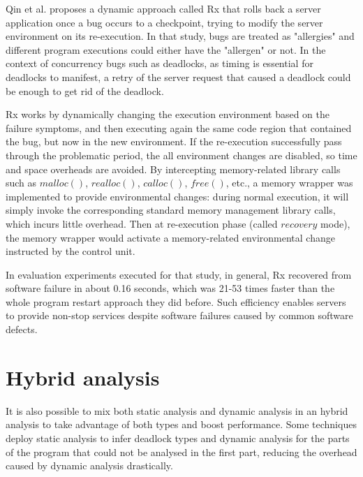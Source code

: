 Qin et al. \cite{rx} proposes a dynamic approach called Rx that rolls back a server application once a bug occurs to a checkpoint,
trying to modify the server environment on its re-execution. In that study, bugs are treated as "allergies" and different program executions
could either have the "allergen" or not. In the context of concurrency bugs such as deadlocks, as timing is essential for deadlocks to manifest,
a retry of the server request that caused a deadlock could be enough to get rid of the deadlock.

Rx works by dynamically changing the execution environment based on the failure symptoms, and then
executing again the same code region that contained the bug, but now in the new environment. If the re-execution successfully pass through the problematic period,
the all environment changes are disabled, so time and space overheads are avoided. By intercepting memory-related library calls such as $malloc()$, $realloc()$,
$calloc()$, $free()$, etc., a memory wrapper was implemented to provide environmental changes: during normal execution, it will simply invoke the corresponding
standard memory management library calls, which incurs little overhead. Then at re-execution phase (called $recovery$ mode), the memory wrapper would activate
a memory-related environmental change instructed by the control unit.

In evaluation experiments executed for that study, in general, Rx recovered from software failure in about 0.16 seconds, which was 21-53 times faster than the whole program restart approach they did before. Such efficiency enables servers to provide non-stop services despite software failures caused by common software defects.


\section{Hybrid analysis}

It is also possible to mix both static analysis and dynamic analysis in an hybrid analysis to take advantage of both types and boost performance.
Some techniques deploy static analysis to infer deadlock types and dynamic analysis for the parts of the program that could not be analysed in the first part,
reducing the overhead caused by dynamic analysis drastically.

